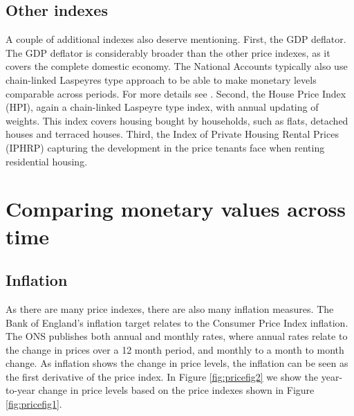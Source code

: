 \documentclass[]{book}
\begin{document}
\hypertarget{other-indexes-1}{%
\subsection{Other indexes}\label{other-indexes-1}}

A couple of additional indexes also deserve mentioning. First, the GDP deflator. The GDP deflator is considerably broader than the other price indexes, as it covers the complete domestic economy. The National Accounts typically also use chain-linked Laspeyres type approach to be able to make monetary levels comparable across periods. For more details see \citep{gdpons}. Second, the House Price Index (HPI), again a chain-linked Laspeyre type index, with annual updating of weights. This index covers housing bought by households, such as flats, detached houses and terraced houses. Third, the Index of Private Housing Rental Prices (IPHRP) capturing the development in the price tenants face when renting residential housing.

\hypertarget{comparing-monetary-values-across-time}{%
\section{Comparing monetary values across time}\label{comparing-monetary-values-across-time}}

\hypertarget{inflation}{%
\subsection{Inflation}\label{inflation}}

As there are many price indexes, there are also many inflation measures. The Bank of England's inflation target relates to the Consumer Price Index inflation. The ONS publishes both annual and monthly rates, where annual rates relate to the change in prices over a 12 month period, and monthly to a month to month change. As inflation shows the change in price levels, the inflation can be seen as the first derivative of the price index. In Figure \ref{fig:pricefig2} we show the year-to-year change in price levels based on the price indexes shown in Figure \ref{fig:pricefig1}.
\end{document}
